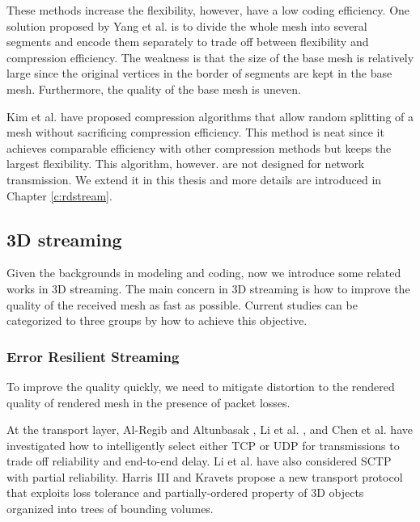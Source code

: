 \documentclass[11pt, a4paper]{report}
\begin{document}
    These methods increase the flexibility, however, have a low coding efficiency.
    One solution proposed by Yang et al. \cite{progressive:Yang}
    is to divide the whole mesh into several segments and encode them
    separately to trade off between flexibility and compression efficiency.
    The weakness is that the size of the base mesh is relatively large
    since the original vertices in the border of segments are kept in the base
    mesh. Furthermore, the quality of the base mesh is uneven.

    Kim et al. \cite{multiresolution:kim}
    have proposed compression algorithms that allow random splitting of a mesh without
    sacrificing compression efficiency. This method is neat since it achieves comparable
    efficiency with other compression methods but keeps the largest flexibility.
    This algorithm, however. are not designed for 
	network transmission.  We extend it in this thesis and more details are introduced
    in Chapter \ref{c:rdstream}.  
    \subsection{3D streaming}
    \label{ss:intro:streaming}
    Given the backgrounds in modeling and coding, now we introduce some
    related works in 3D streaming. 
    The main concern in 3D streaming is how to improve the quality of the received
    mesh as fast as possible. Current studies can be categorized to three groups
    by how to achieve this objective.
    
    \subsubsection{Error Resilient Streaming}
    To improve the quality quickly, we need to mitigate distortion to the 
    rendered quality of rendered mesh in the presence of packet losses.

    At the transport layer, Al-Regib and Altunbasak \cite{3tpregib}, Li
    et al. \cite{Li2006}, and Chen et al. \cite{chen05hybrid} have
    investigated how to intelligently select either TCP or UDP for
    transmissions to trade off reliability and end-to-end delay.  Li et
    al. have also considered SCTP with partial reliability.
    Harris III and Kravets \cite{harris:design} propose a new
    transport protocol that exploits loss tolerance and
    partially-ordered property of 3D objects organized into trees of
    bounding volumes.
\end{document}
